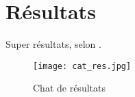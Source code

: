 \documentclass[../main.tex]{subfiles}
\begin{document}
\ifSubfilesClassLoaded{
}{}
\chapter{Résultats}

Super résultats, selon \cite{einstein}.

\begin{figure}[h]
    \centering
    \texttt{[image: cat\_res.jpg]}
    \caption{Chat de résultats}
    \label{fig:chat_res}
\end{figure}
\ifSubfilesClassLoaded{%
    \printbibliography%
}{}
\end{document}

